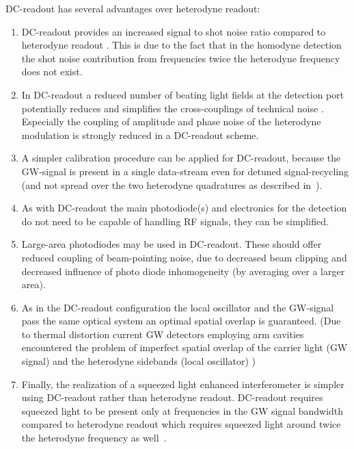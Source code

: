 \FloatBarrier

{
DC-readout has several advantages over heterodyne
readout:
\begin{enumerate}
\item
DC-readout provides an increased 
signal to shot noise ratio compared to heterodyne readout \cite{Buonanno2003}. This is 
due to the fact that in the homodyne detection the shot noise contribution from frequencies 
twice the heterodyne frequency 
does not exist. 
\item
In DC-readout a reduced number of beating light fields at the detection port potentially reduces and 
simplifies the cross-couplings of technical noise \cite{Hildtuned_detuned2007}. Especially 
the coupling of amplitude and phase noise of the heterodyne modulation is 
strongly reduced in a DC-readout scheme. 
\item
A simpler calibration procedure can be applied for DC-readout, because the GW-signal is present in a single
data-stream even for
detuned signal-recycling (and not spread over the two heterodyne quadratures as
described in~\cite{Hewitson05}).
\item
As with DC-readout the main photodiode(s) and electronics for the detection do not need to be capable of
handling RF signals, they can be simplified.
\item
Large-area photodiodes may be used in DC-readout. These should offer reduced coupling of beam-pointing 
noise, due to decreased beam clipping and decreased influence of 
photo diode inhomogeneity (by averaging over a larger area). 
\item
As in the DC-readout configuration the local oscillator and the GW-signal pass the same optical system an 
optimal spatial overlap is guaranteed. (Due to thermal distortion current GW detectors 
employing arm cavities encountered the problem of imperfect spatial overlap of the carrier light 
(GW signal) and the heterodyne sidebands (local oscillator) \cite{Lawrence03})
\item Finally, the realization of a squeezed light enhanced
interferometer is simpler using DC-readout rather than heterodyne
readout. DC-readout requires squeezed light to be present only at
frequencies in the GW signal bandwidth compared to heterodyne
readout which requires squeezed light around twice the heterodyne
frequency as well~\cite{CDRGBM98}.
\end{enumerate}
}
